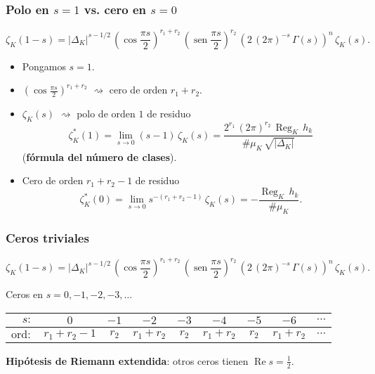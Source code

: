 \documentclass{beamer}
\DeclareMathOperator{\Reg}{Reg}
\renewcommand{\Re}{\operatorname{Re}}
\renewcommand{\sin}{\operatorname{sen}}
\begin{document}
\begin{frame}
  \frametitle{Polo en $s = 1$ vs. cero en $s = 0$}

  \[ \zeta_K (1-s) = |\Delta_K|^{s - 1/2}\,\left(\cos\frac{\pi s}{2}\right)^{r_1+r_2}\,\left(\sin\frac{\pi s}{2}\right)^{r_2}\,\left(2\,(2\pi)^{-s}\,\Gamma (s)\right)^n\,\zeta_K (s). \]

  \begin{itemize}
  \item<1-> Pongamos $s = 1$.

  \item<2-> $\left(\cos\frac{\pi s}{2}\right)^{r_1+r_2}$ $\rightsquigarrow$ cero de orden $r_1 + r_2$.

  \item<3-> $\zeta_K (s)$ $\rightsquigarrow$ polo de orden $1$ de residuo
    $$\zeta_K^* (1) = \lim_{s \to 0} (s-1)\,\zeta_K (s) = \frac{2^{r_1}\,(2\pi)^{r_2}\,\Reg_K\,h_k}{\#\mu_K\,\sqrt{|\Delta_K|}}$$
    (\textbf{fórmula del número de clases}).

  \item<4-> Cero de orden $r_1 + r_2 - 1$ de residuo
    $$\zeta_K^* (0) = \lim_{s \to 0} s^{-(r_1 + r_2 - 1)}\,\zeta_K (s) = -\frac{\Reg_K\,h_k}{\# \mu_K}.$$
  \end{itemize}
\end{frame}


\begin{frame}
  \frametitle{Ceros triviales}

  \[ \zeta_K (1-s) = |\Delta_K|^{s - 1/2}\,\left(\cos\frac{\pi s}{2}\right)^{r_1+r_2}\,\left(\sin\frac{\pi s}{2}\right)^{r_2}\,\left(2\,(2\pi)^{-s}\,\Gamma (s)\right)^n\,\zeta_K (s). \]

  Ceros en $s = 0,-1,-2,-3,\ldots$
  \begin{center}\small
    \renewcommand{\arraystretch}{1.5}
    \begin{tabular}{rcccccccc}
      \hline
      $s\colon$ & $0$ & $-1$ & $-2$ & $-3$ & $-4$ & $-5$ & $-6$ & $\cdots$ \\
      \hline
      $\text{ord}\colon$ & $r_1 + r_2 - 1$ & $r_2$ & $r_1 + r_2$ & $r_2$ & $r_1 + r_2$ & $r_2$ & $r_1 + r_2$ & $\cdots$ \\
      \hline
    \end{tabular}
  \end{center}

  \textbf{Hipótesis de Riemann extendida}: otros ceros tienen
  $\Re s = \frac{1}{2}$.
\end{frame}
\end{document}

